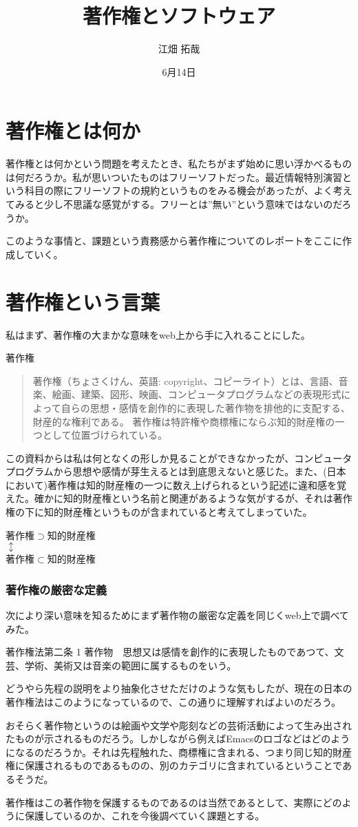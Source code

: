 \documentclass[a4j]{jsarticle}
\title{著作権とソフトウェア}
\author{江畑 拓哉}
\date{6月14日}
\begin{document}
\maketitle
\part{著作権とは何か}
著作権とは何かという問題を考えたとき、私たちがまず始めに思い浮かべるものは何だろうか。私が思いついたものはフリーソフトだった。最近情報特別演習という科目の際にフリーソフトの規約というものをみる機会があったが、よく考えてみると少し不思議な感覚がする。フリーとは”無い”という意味ではないのだろうか。\par
このような事情と、課題という責務感から著作権についてのレポートをここに作成していく。
\part{著作権という言葉}
私はまず、著作権の大まかな意味をweb上から手に入れることにした。
\begin{itembox}{著作権\cite{def_t}}
 \begin{quote}
 著作権（ちょさくけん、英語: copyright、コピーライト）とは、言語、音楽、絵画、建築、図形、映画、コンピュータプログラムなどの表現形式によって自らの思想・感情を創作的に表現した著作物を排他的に支配する、財産的な権利である。 著作権は特許権や商標権にならぶ知的財産権の一つとして位置づけられている。
  \end{quote}
\end{itembox}
この資料からは私は何となくの形しか見ることができなかったが、コンピュータプログラムから思想や感情が芽生えるとは到底思えないと感じた。また、(日本において)著作権は知的財産権の一つに数え上げられるという記述に違和感を覚えた。確かに知的財産権という名前と関連があるような気がするが、それは著作権の下に知的財産権というものが含まれていると考えてしまっていた。
\begin{center}
 著作権$\supset$知的財産権\\
 $\updownarrow$ \\
 著作権$\subset$知的財産権
\end{center}
\section*{著作権の厳密な定義}
次により深い意味を知るためにまず著作物の厳密な定義を同じくweb上で調べてみた。
\begin{itembox}{著作権法第二条 1\cite{def_t_r}}
 著作物　思想又は感情を創作的に表現したものであつて、文芸、学術、美術又は音楽の範囲に属するものをいう。
\end{itembox}
どうやら先程の説明をより抽象化させただけのような気もしたが、現在の日本の著作権法はこのようになっているので、この通りに理解すればよいのだろう。\par
おそらく著作物というのは絵画や文学や彫刻などの芸術活動によって生み出されたものが示されるものだろう。しかしながら例えばEmacsのロゴなどはどのようになるのだろうか。それは先程触れた、商標権に含まれる、つまり同じ知的財産権に保護されるものであるものの、別のカテゴリに含まれているということであるそうだ。\par
著作権はこの著作物を保護するものであるのは当然であるとして、実際にどのように保護しているのか、これを今後調べていく課題とする。
\end{document}
